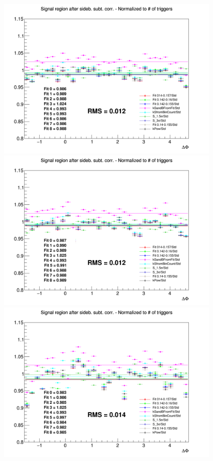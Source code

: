 \begin{figure}
{\includegraphics[width=0.31\linewidth]{figuresVsCent/Dstar/SystSandB/2060_SandB_Syst/Ratio_AzimCorrDistr_Dstar_Canvas_PtIntBins7to9_PoolInt_thr03to99_YIELD_2060.png}}
{\includegraphics[width=0.31\linewidth]{figuresVsCent/Dstar/SystSandB/2060_SandB_Syst/Ratio_AzimCorrDistr_Dstar_Canvas_PtIntBins7to9_PoolInt_thr03to1_YIELD_2060.png}}
{\includegraphics[width=0.31\linewidth]{figuresVsCent/Dstar/SystSandB/2060_SandB_Syst/Ratio_AzimCorrDistr_Dstar_Canvas_PtIntBins7to9_PoolInt_thr1to99_YIELD_2060.png}} \\


\end{figure}
